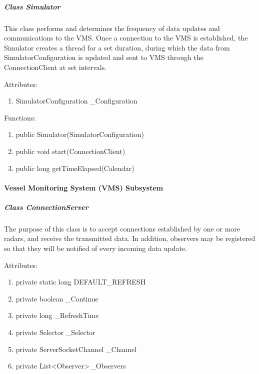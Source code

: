 \documentclass{article}
\begin{document}
\subparagraph{Class Simulator}
This class performs and determines the frequency of data updates and communications to the VMS. Once a connection to the VMS is established, the Simulator creates a thread for a set duration, during which the data from SimulatorConfiguration is updated and sent to VMS through the ConnectionClient at set intervals.

Attributes:
\begin{enumerate}
	\item SimulatorConfiguration \_Configuration
\end {enumerate}

Functions:
\begin{enumerate}
	\item public Simulator(SimulatorConfiguration)
	\item public void start(ConnectionClient)
	\item public long getTimeElapsed(Calendar)
\end{enumerate}

\paragraph{Vessel Monitoring System (VMS) Subsystem}

\subparagraph{Class ConnectionServer}
The purpose of this class is to accept connections established by one or more radars, and receive the transmitted data. In addition, observers may be registered so that they will be notified of every incoming data update.

Attributes:
\begin{enumerate}
	\item private static long DEFAULT\_REFRESH
    \item private boolean \_Continue
    \item private long \_RefreshTime
    \item private Selector \_Selector
    \item private ServerSocketChannel \_Channel
    \item private List\textless Observer\textgreater \,\_Observers
\end {enumerate}
\end{document}
